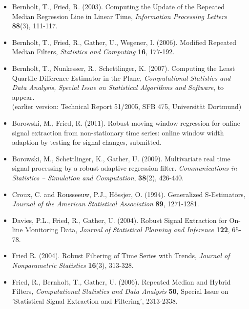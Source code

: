 \documentclass[a4paper]{scrartcl}
\begin{document}
\renewcommand{\labelitemi}{ }
\begin{itemize}
\item
Bernholt, T., Fried, R. (2003). Computing the Update of the Repeated
Median Regression Line in Linear Time, \emph{Information Processing
Letters} \textbf{88}(3), 111-117.

\item
Bernholt, T., Fried, R., Gather, U., Wegener, I. (2006). Modified
Repeated Median Filters, \emph{Statistics and Computing} \textbf{16}, 177-192.

\item
Bernholt, T., Nunkesser, R., Schettlinger, K. (2007). Computing
the Least Quartile Difference Estimator in the Plane,
\emph{Computational Statistics and Data Analysis, Special Issue on
Statistical Algorithms and Software}, to appear.\\
(earlier version:
Technical Report 51/2005, SFB 475, Universit\"{a}t Dortmund)

\item
Borowski, M., Fried, R. (2011).
Robust moving window regression for online signal extraction from non-stationary time series: online window width adaption by testing for signal changes, submitted.

\item
Borowski, M., Schettlinger, K., Gather, U. (2009). Multivariate real time signal processing by a robust adaptive regression filter. \emph{Communications in Statistics -- Simulation and Computation}, \textbf{38}(2), 426-440.

\item
Croux, C. and Rousseeuw, P.J., H\"{o}ssjer, O.
(1994). Generalized S-Estimators, \emph{Journal of the American Statistical
Association}
\textbf{89}, 1271-1281.

\item
Davies, P.L., Fried, R., Gather, U. (2004). Robust Signal Extraction
for On-line Monitoring Data, \emph{Journal of Statistical Planning
and Inference} \textbf{122}, 65-78.

\item
Fried R. (2004). Robust Filtering of Time Series with Trends, \emph{Journal
of Nonparametric Statistics} \textbf{16}(3), 313-328.

\item
Fried, R., Bernholt, T., Gather, U. (2006). Repeated Median and
Hybrid Filters, \emph{Computational Statistics and Data Analysis} \textbf{50},
Special Issue on 'Statistical Signal Extraction and Filtering',
2313-2338.


\end{itemize}
\end{document}
